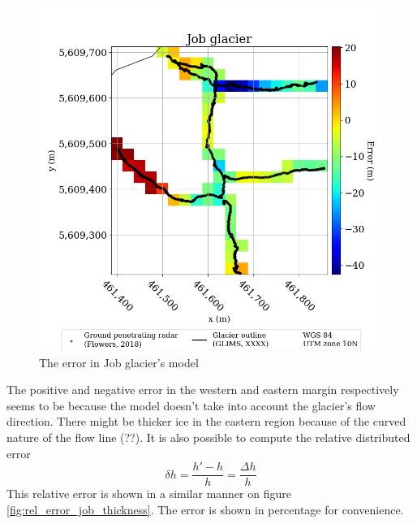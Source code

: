 \documentclass[a4, 12pt]{article}
\begin{document}
\begin{figure}[h!]
\centering
\includegraphics[scale=0.4]{../job_kluane_maps/Job glacier_error.png}
\caption{The error in Job glacier's model}
\label{fig:error_job_thickness}
\end{figure}
The positive and negative error in the western and eastern margin respectively seems to be because the model doesn't take into account the glacier's flow direction. There might be thicker ice in the eastern region because of the curved nature of the flow line (??). It is also possible to compute the relative distributed error \[\delta h = \frac{h' - h}{h} = \frac{\Delta h}{h}\]
This relative error is shown in a similar manner on figure \ref{fig:rel_error_job_thickness}. The error is shown in percentage for convenience.
\end{document}
